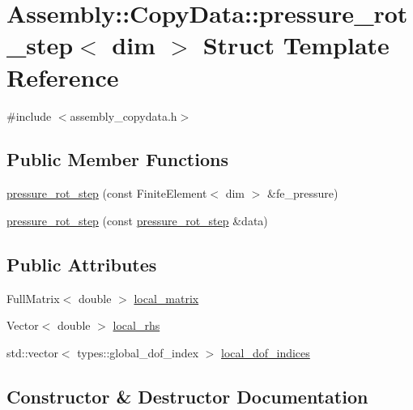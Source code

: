\hypertarget{struct_assembly_1_1_copy_data_1_1pressure__rot__step}{}\section{Assembly\+:\+:Copy\+Data\+:\+:pressure\+\_\+rot\+\_\+step$<$ dim $>$ Struct Template Reference}
\label{struct_assembly_1_1_copy_data_1_1pressure__rot__step}


{\ttfamily \#include $<$assembly\+\_\+copydata.\+h$>$}

\subsection*{Public Member Functions}
\begin{DoxyCompactItemize}
\item 
\hyperlink{struct_assembly_1_1_copy_data_1_1pressure__rot__step_add5e474ef4a3a50803ac2e722ef7fc7a}{pressure\+\_\+rot\+\_\+step} (const Finite\+Element$<$ dim $>$ \&fe\+\_\+pressure)
\item 
\hyperlink{struct_assembly_1_1_copy_data_1_1pressure__rot__step_ab2fc649ebf1d5b280883f7e4f62cb4e3}{pressure\+\_\+rot\+\_\+step} (const \hyperlink{struct_assembly_1_1_copy_data_1_1pressure__rot__step}{pressure\+\_\+rot\+\_\+step} \&data)
\end{DoxyCompactItemize}
\subsection*{Public Attributes}
\begin{DoxyCompactItemize}
\item 
Full\+Matrix$<$ double $>$ \hyperlink{struct_assembly_1_1_copy_data_1_1pressure__rot__step_a316a4598a7bed63334bcb4699469f366}{local\+\_\+matrix}
\item 
Vector$<$ double $>$ \hyperlink{struct_assembly_1_1_copy_data_1_1pressure__rot__step_a43d09c97e5a67574fd254c7539b8d439}{local\+\_\+rhs}
\item 
std\+::vector$<$ types\+::global\+\_\+dof\+\_\+index $>$ \hyperlink{struct_assembly_1_1_copy_data_1_1pressure__rot__step_ade1a65d97b3092835d27a4cd6295482f}{local\+\_\+dof\+\_\+indices}
\end{DoxyCompactItemize}


\subsection{Constructor \& Destructor Documentation}
\hypertarget{struct_assembly_1_1_copy_data_1_1pressure__rot__step_add5e474ef4a3a50803ac2e722ef7fc7a}{}
